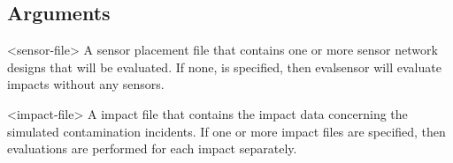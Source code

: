 \subsection{Arguments}\label{evalsensorExecutable_evalsensorArguments}
\begin{unknownListing}
     <sensor-file>
     A sensor placement file that contains one or more sensor network designs 
	 that will be evaluated. If none, is specified, then evalsensor will evaluate 
	 impacts without any sensors.
     
     <impact-file>
     A impact file that contains the impact data concerning the simulated contamination 
	 incidents. If one or more impact files are specified, then evaluations are 
	 performed for each impact separately.
\end{unknownListing}

%

